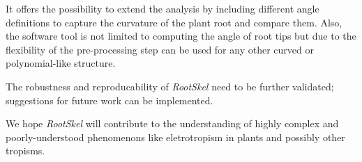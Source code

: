 It offers the possibility to extend the analysis by including different angle definitions to capture the curvature of the plant root and compare them. Also, the software tool is not limited to computing the angle of root tips but due to the flexibility of the pre-processing step can be used for any other curved or polynomial-like structure. 

The robustness and reproducability of \textit{RootSkel} need to be further validated; suggestions for future work can be implemented. 

We hope \textit{RootSkel} will contribute to the understanding of highly complex and poorly-understood phenomenons like eletrotropism in plants and possibly other tropisms. %

%



